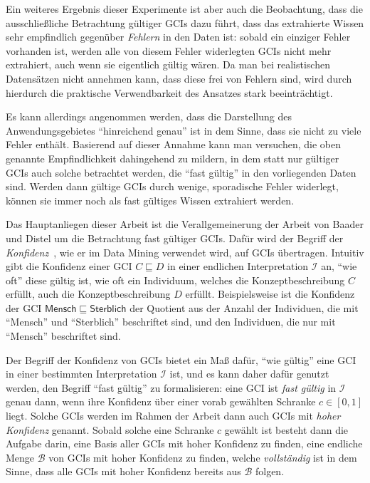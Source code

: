 \documentclass[ngerman,fleqn,DIV=12]{scrartcl}
\begin{document}
Ein weiteres Ergebnis dieser Experimente ist aber auch die Beobachtung, dass die
ausschließliche Betrachtung gültiger GCIs dazu führt, dass das extrahierte Wissen sehr
empfindlich gegenüber \emph{Fehlern} in den Daten ist: sobald ein einziger Fehler
vorhanden ist, werden alle von diesem Fehler widerlegten GCIs nicht mehr extrahiert, auch
wenn sie eigentlich gültig wären.  Da man bei realistischen Datensätzen nicht annehmen
kann, dass diese frei von Fehlern sind, wird durch hierdurch die praktische Verwendbarkeit
des Ansatzes stark beeinträchtigt.

Es kann allerdings angenommen werden, dass die Darstellung des Anwendungsgebietes
\enquote{hinreichend genau} ist in dem Sinne, dass sie nicht zu viele Fehler enthält.
Basierend auf dieser Annahme kann man versuchen, die oben genannte Empfindlichkeit
dahingehend zu mildern, in dem statt nur gültiger GCIs auch solche betrachtet werden, die
\enquote{fast gültig} in den vorliegenden Daten sind.  Werden dann gültige GCIs durch
wenige, sporadische Fehler widerlegt, können sie immer noch als fast gültiges Wissen
extrahiert werden.

Das Hauptanliegen dieser Arbeit ist die Verallgemeinerung der Arbeit von Baader und Distel
um die Betrachtung fast gültiger GCIs.  Dafür wird der Begriff der
\emph{Konfidenz}~\cite{arules:agrawal:association-rules}, wie er im Data Mining verwendet
wird, auf GCIs übertragen.  Intuitiv gibt die Konfidenz einer GCI $C \sqsubseteq D$ in
einer endlichen Interpretation $\mathcal{I}$ an, \enquote{wie oft} diese gültig ist, \dh
wie oft ein Individuum, welches die Konzeptbeschreibung $C$ erfüllt, auch die
Konzeptbeschreibung $D$ erfüllt.  Beispielsweise ist die Konfidenz der GCI
$\mathsf{Mensch} \sqsubseteq \mathsf{Sterblich}$ der Quotient aus der Anzahl der
Individuen, die mit \enquote{\textsf{Mensch}} und \enquote{\textsf{Sterblich}} beschriftet
sind, und den Individuen, die nur mit \enquote{\textsf{Mensch}} beschriftet sind.

Der Begriff der Konfidenz von GCIs bietet ein Maß dafür, \enquote{wie gültig} eine GCI in
einer bestimmten Interpretation $\mathcal{I}$ ist, und es kann daher dafür genutzt werden,
den Begriff \enquote{fast gültig} zu formalisieren: eine GCI ist \emph{fast gültig} in
$\mathcal{I}$ genau dann, wenn ihre Konfidenz über einer vorab gewählten Schranke $c \in
[0,1]$ liegt.  Solche GCIs werden im Rahmen der Arbeit dann auch GCIs mit \emph{hoher
  Konfidenz} genannt.  Sobald solche eine Schranke $c$ gewählt ist besteht dann die
Aufgabe darin, eine Basis aller GCIs mit hoher Konfidenz zu finden, \dh eine endliche
Menge $\mathcal{B}$ von GCIs mit hoher Konfidenz zu finden, welche \emph{vollständig} ist
in dem Sinne, dass alle GCIs mit hoher Konfidenz bereits aus $\mathcal{B}$ folgen.
\end{document}
